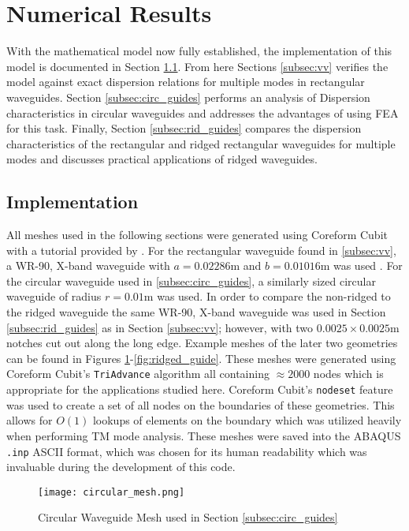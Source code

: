\section{Numerical Results}
\label{sec:numres}
With the mathematical model now fully established, the implementation of this model is documented in Section \ref{subsec:impl}. From here Sections \ref{subsec:vv} verifies the model against exact dispersion relations for multiple modes in rectangular waveguides. Section \ref{subsec:circ_guides} performs an analysis of Dispersion characteristics in circular waveguides and addresses the advantages of using FEA for this task. Finally, Section \ref{subsec:rid_guides} compares the dispersion characteristics of the rectangular and ridged rectangular waveguides for multiple modes and discusses practical applications of ridged waveguides.

\subsection{Implementation}
\label{subsec:impl}
All meshes used in the following sections were generated using Coreform Cubit \cite{cubit} with a tutorial provided by \cite{rothlecnotes}. For the rectangular waveguide found in \ref{subsec:vv}, a WR-90, X-band waveguide with $a=0.02286$m and $b=0.01016$m was used \cite{everythingrf}. For the circular waveguide used in \ref{subsec:circ_guides}, a similarly sized circular waveguide of radius $r=0.01$m was used. In order to compare the non-ridged to the ridged waveguide the same WR-90, X-band waveguide was used in Section \ref{subsec:rid_guides} as in Section \ref{subsec:vv}; however, with two $0.0025\times0.0025$m notches cut out along the long edge. Example meshes of the later two geometries can be found in Figures \ref{fig:circular_guide}-\ref{fig:ridged_guide}. These meshes were generated using Coreform Cubit's \verb|TriAdvance| algorithm all containing $\approx2000$ nodes which is appropriate for the applications studied here. Coreform Cubit's \verb|nodeset| feature was used to create a set of all nodes on the boundaries of these geometries. This allows for $O(1)$ lookups of elements on the boundary which was utilized heavily when performing TM mode analysis. These meshes were saved into the ABAQUS \verb|.inp| ASCII format, which was chosen for its human readability which was invaluable during the development of this code.

\begin{figure}[h!]  
	\centering
	\texttt{[image: circular\_mesh.png]} 
	\caption{Circular Waveguide Mesh used in Section \ref{subsec:circ_guides}}
	\label{fig:circular_guide}
\end{figure}

